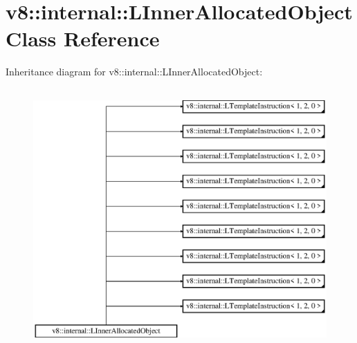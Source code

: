 \hypertarget{classv8_1_1internal_1_1_l_inner_allocated_object}{}\section{v8\+:\+:internal\+:\+:L\+Inner\+Allocated\+Object Class Reference}
\label{classv8_1_1internal_1_1_l_inner_allocated_object}
Inheritance diagram for v8\+:\+:internal\+:\+:L\+Inner\+Allocated\+Object\+:\begin{figure}[H]
\begin{center}
\leavevmode
\includegraphics[height=10.000000cm]{classv8_1_1internal_1_1_l_inner_allocated_object}
\end{center}
\end{figure}
